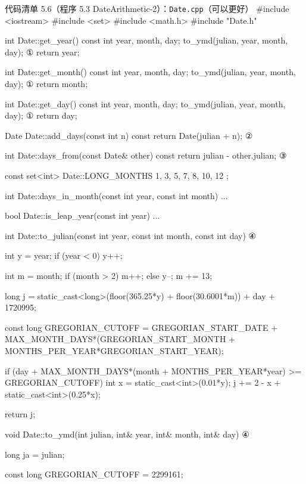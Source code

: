 \begin{codeboxt}{代码清单 5.6（程序 5.3 DateArithmetic-2）：\texttt{Date.cpp}（可以更好）}
#include <iostream>
#include <set>
#include <math.h>
#include "Date.h"

int Date::get_year() const
{
    int year, month, day;
    to_ymd(julian, year, month, day);                               ①
    return year;
}

int Date::get_month() const
{
    int year, month, day;
    to_ymd(julian, year, month, day);                               ①
    return month;
}

int Date::get_day() const
{
    int year, month, day;
    to_ymd(julian, year, month, day);                               ①
    return day;
}

Date Date::add_days(const int n) const 
{ 
    return Date(julian + n);                                        ②
}

int Date::days_from(const Date& other) const
{
    return julian - other.julian;                                   ③
}

const set<int> Date::LONG_MONTHS { 1, 3, 5, 7, 8, 10, 12 };

int Date::days_in_month(const int year, const int month) ...

bool Date::is_leap_year(const int year) ...

int Date::to_julian(const int year, const int month, const int day) ④
{
    int y = year;
    if (year < 0) y++;

    int m = month;
    if (month > 2) m++;
    else
    {
        y--;
        m += 13;
    }

    long j = static_cast<long>(floor(365.25*y) + floor(30.6001*m))
                    + day + 1720995;

    const long GREGORIAN_CUTOFF =
        GREGORIAN_START_DATE +
        MAX_MONTH_DAYS*(GREGORIAN_START_MONTH +
                               MONTHS_PER_YEAR*GREGORIAN_START_YEAR);

    if (day + MAX_MONTH_DAYS*(month + MONTHS_PER_YEAR*year) >=
                                                    GREGORIAN_CUTOFF)
    {
        int x = static_cast<int>(0.01*y);
        j += 2 - x + static_cast<int>(0.25*x);
    }

    return j;
}

void Date::to_ymd(int julian, int& year, int& month, int& day)      ④
{
    long ja = julian;

    const long GREGORIAN_CUTOFF = 2299161;

}
\end{codeboxt}
